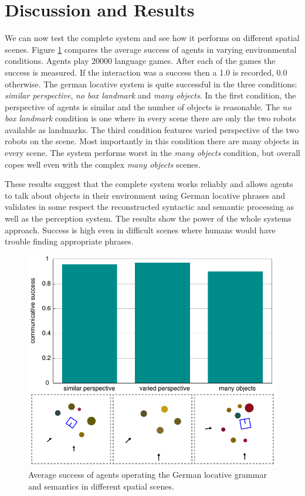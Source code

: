 \section{Discussion and Results}
\label{s:syntax+semantics-integration}
We can now test the complete system and see how it performs
on different spatial scenes. Figure \ref{f:interpretations} compares the average success 
of agents in varying environmental conditions. Agents play 20000 language
games. After each of the games the success is measured. If the interaction 
was a success then a 1.0 is recorded, 0.0 otherwise. The german locative system 
is quite successful in the three conditions: \emph{similar perspective}, 
\emph{no box landmark} and \emph{many objects}. In the first condition, the 
perspective of agents is similar and the number of objects is reasonable.
The \emph{no box landmark} condition is one where in every scene there are only the two
robots available as landmarks. The third condition features varied perspective of the two
robots on the scene. Most importantly in this condition there are many objects in every scene.
The system performs worst in the \emph{many objects} condition, but overall copes 
well even with the complex \emph{many objects} scenes.

These results suggest that the complete system works reliably and allows agents
to talk about objects in their environment using German locative phrases and
validates in some respect the reconstructed syntactic and semantic processing 
as well as the perception system. The results show the power of the whole systems approach.
Success is high even in difficult scenes where humans would have trouble finding appropriate
phrases.


\begin{figure}
\begin{center}
\includegraphics[width=1.0\columnwidth]{figs/results-german-grammar}
\end{center}
\caption[Average success of agents operating the German locative system]{
Average success of agents operating the German locative grammar
and semantics in different spatial scenes.}
\label{f:interpretations}
\end{figure}


%
% 
%